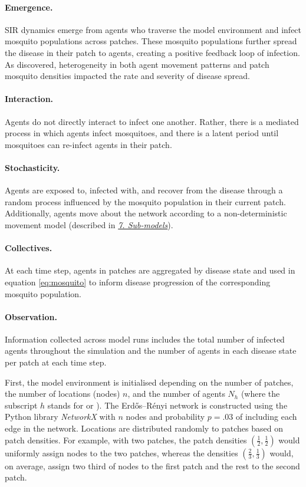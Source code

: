 \paragraph{Emergence.} SIR dynamics emerge from agents who traverse the model environment and infect mosquito populations across patches. These mosquito populations further spread the disease in their patch to agents, creating a positive feedback loop of infection. As \citet{manore_network-patch_2015} discovered, heterogeneity in both agent movement patterns and patch mosquito densities impacted the rate and severity of disease spread.

\paragraph{Interaction.} Agents do not directly interact to infect one another. Rather, there is a mediated process in which agents infect mosquitoes, and there is a latent period until mosquitoes can re-infect agents in their patch.

\paragraph{Stochasticity.} Agents are exposed to, infected with, and recover from the disease through a random process influenced by the mosquito population in their current patch. Additionally, agents move about the network according to a non-deterministic movement model (described in \hyperref[oddsec:submodels]{\textit{7. Sub-models}}).

\paragraph{Collectives.} At each time step, agents in patches are aggregated by disease state and used in equation \eqref{eq:mosquito} to inform disease progression of the corresponding mosquito population.

\paragraph{Observation.} Information collected across model runs includes the total number of infected agents throughout the simulation and the number of agents in each disease state per patch at each time step.

\label{oddsec:initialisation}


First, the model environment is initialised depending on the number of patches, the number of locations (nodes) $n$, and the number of agents $N_h$ (where the subscript $h$ stands for  or ). The Erdős–Rényi network is constructed using the Python library \textit{NetworkX} \cite{hagberg_exploring_2008} with $n$ nodes and probability $p=.03$ of including each edge in the network. Locations are distributed randomly to patches based on patch densities. For example, with two patches, the patch densities $\left(\frac{1}{2},\frac{1}{2}\right)$ would uniformly assign nodes to the two patches, whereas the densities $\left(\frac{2}{3},\frac{1}{3}\right)$ would, on average, assign two third of nodes to the first patch and the rest to the second patch.

